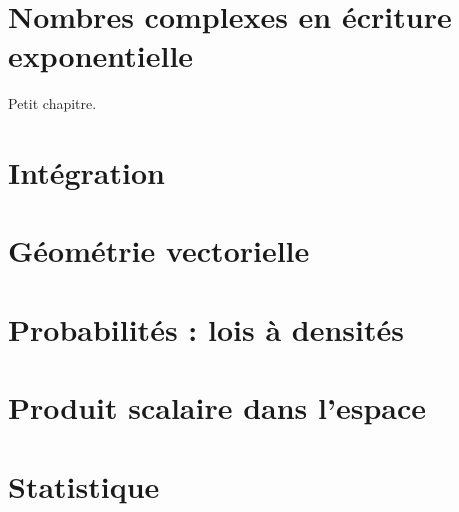 \documentclass[a4paper,11pt,DIV11,BCOR0mm]{scrartcl}
\begin{document}
\section{Nombres complexes en écriture exponentielle}
Petit chapitre.
\section{Intégration}

\section{Géométrie vectorielle}

\section{Probabilités : lois à densités}

\section{Produit scalaire dans l'espace}

\section{Statistique}
\end{document}
